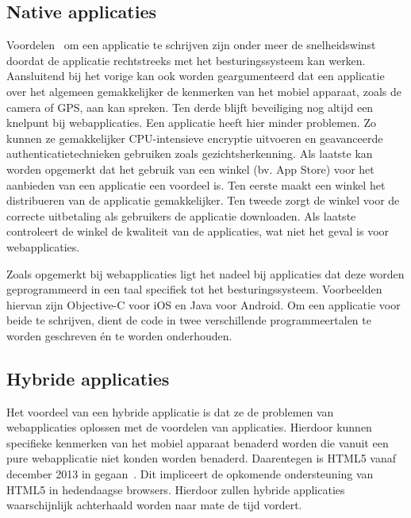 \subsection{Native applicaties}
\label{sec:literatuur-native}
Voordelen~\cite{Accenture2012} om een  applicatie te schrijven zijn onder meer de snelheidswinst doordat de applicatie rechtstreeks met het besturingssysteem kan werken. 
Aansluitend bij het vorige kan ook worden geargumenteerd dat een  applicatie over het algemeen gemakkelijker de kenmerken van het mobiel apparaat, zoals de camera of GPS, aan kan spreken. 
Ten derde blijft beveiliging nog altijd een knelpunt bij webapplicaties. Een  applicatie heeft hier minder problemen. 
Zo kunnen ze gemakkelijker CPU-intensieve encryptie uitvoeren en geavanceerde authenticatietechnieken gebruiken zoals gezichtsherkenning.
Als laatste kan worden opgemerkt dat het gebruik van een winkel (bv. App Store) voor het aanbieden van een applicatie een voordeel is.
Ten eerste maakt een winkel het distribueren van de applicatie gemakkelijker.
Ten tweede zorgt de winkel voor de correcte uitbetaling als gebruikers de applicatie downloaden.
Als laatste controleert de winkel de kwaliteit van de applicaties, wat niet het geval is voor webapplicaties.

Zoals opgemerkt bij webapplicaties ligt het nadeel bij  applicaties dat deze worden geprogrammeerd in een taal specifiek tot het besturingssysteem.
Voorbeelden hiervan zijn Objective-C voor iOS en Java voor Android.
Om een applicatie voor beide te schrijven, dient de code in twee verschillende programmeertalen te worden geschreven én te worden onderhouden.

\subsection{Hybride applicaties}
\label{sec:literatuur-hydribe}
Het voordeel van een hybride applicatie is dat ze de problemen van webapplicaties oplossen met de voordelen van  applicaties.
Hierdoor kunnen specifieke kenmerken van het mobiel apparaat benaderd worden die vanuit een pure webapplicatie niet konden worden benaderd.
Daarentegen is HTML5 vanaf december 2013 in  gegaan~\cite{Jacobs2012}.
Dit impliceert de opkomende ondersteuning van HTML5 in hedendaagse browsers.
Hierdoor zullen hybride applicaties waarschijnlijk achterhaald worden naar mate de tijd vordert.


